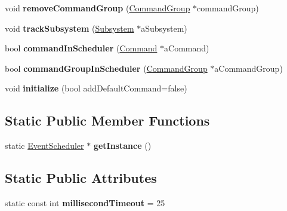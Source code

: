 \begin{DoxyCompactItemize}
void {\bfseries remove\+Command\+Group} (\mbox{\hyperlink{classlib_iterative_robot_1_1_command_group}{Command\+Group}} $\ast$command\+Group)
\item 
\mbox{\label{classlib_iterative_robot_1_1_event_scheduler_a1130cfd602dec9e4091571b47b60f378}} 
void {\bfseries track\+Subsystem} (\mbox{\hyperlink{classlib_iterative_robot_1_1_subsystem}{Subsystem}} $\ast$a\+Subsystem)
\item 
\mbox{\label{classlib_iterative_robot_1_1_event_scheduler_acc46d20d5b6e1b6d308bf64dd12ea791}} 
bool {\bfseries command\+In\+Scheduler} (\mbox{\hyperlink{classlib_iterative_robot_1_1_command}{Command}} $\ast$a\+Command)
\item 
\mbox{\label{classlib_iterative_robot_1_1_event_scheduler_af47242d40b09df43698bb00cbe4f9300}} 
bool {\bfseries command\+Group\+In\+Scheduler} (\mbox{\hyperlink{classlib_iterative_robot_1_1_command_group}{Command\+Group}} $\ast$a\+Command\+Group)
\item 
\mbox{\label{classlib_iterative_robot_1_1_event_scheduler_a8d45ea3763e171da6e3990acdd864df3}} 
void {\bfseries initialize} (bool add\+Default\+Command=false)
\end{DoxyCompactItemize}
\subsection*{Static Public Member Functions}
\begin{DoxyCompactItemize}
\item 
\mbox{\label{classlib_iterative_robot_1_1_event_scheduler_a04480f5533265708f49b23e622ffe9cb}} 
static \mbox{\hyperlink{classlib_iterative_robot_1_1_event_scheduler}{Event\+Scheduler}} $\ast$ {\bfseries get\+Instance} ()
\end{DoxyCompactItemize}
\subsection*{Static Public Attributes}
\begin{DoxyCompactItemize}
\item 
\mbox{\label{classlib_iterative_robot_1_1_event_scheduler_a5c2a1365cdcf713b0dbe722b9156290e}} 
static const int {\bfseries millisecond\+Timeout} = 25
\end{DoxyCompactItemize}
